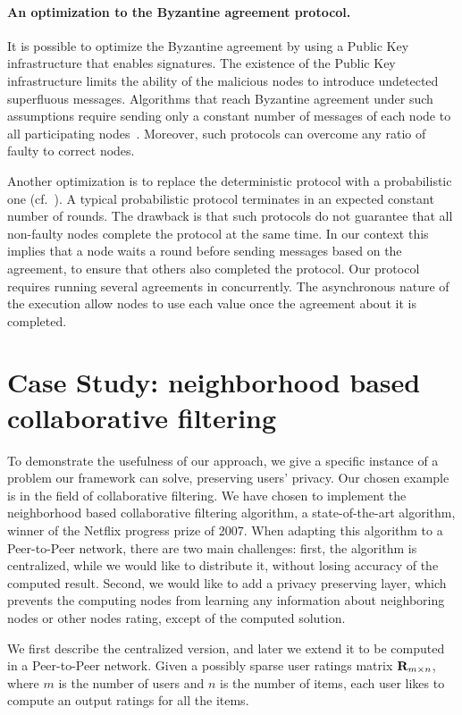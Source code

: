 \documentclass[10pt]{svjour3}
\begin{document}
\paragraph{An optimization to the Byzantine agreement protocol.}
It is possible to optimize the Byzantine agreement by using a Public Key infrastructure that enables signatures.
The existence of the Public Key infrastructure limits the ability of the malicious nodes to introduce undetected superfluous messages.  Algorithms that reach Byzantine agreement under such assumptions require sending only a constant number of messages of each node to all participating nodes~\cite{DS82}. Moreover, such protocols can overcome any ratio of faulty to correct nodes.

Another optimization is to replace the deterministic protocol with a probabilistic one (cf.~\cite{Benor83,FM89,CR93}). A typical probabilistic protocol terminates in an expected constant number of rounds.  The drawback is that such protocols do not guarantee that all non-faulty nodes complete the protocol at the same time. In our context this implies that a node waits a round before sending messages based on the agreement, to ensure that others also completed the protocol. Our protocol requires running several agreements in concurrently.  The asynchronous nature of the execution allow nodes to use each value once the agreement about it is completed.



\section{Case Study: neighborhood based collaborative filtering}
\label{jacobi} To demonstrate the usefulness of our approach, we
give a specific instance of a problem our framework can solve,
preserving users' privacy. Our chosen example is in the field of
collaborative filtering. We have chosen to implement the
neighborhood based collaborative filtering algorithm, a
state-of-the-art algorithm, winner of the Netflix progress prize
of 2007. When adapting this algorithm to a Peer-to-Peer network,
there are two main challenges: first, the algorithm is
centralized, while we would like to distribute it, without losing
accuracy of the computed result. Second, we would like to add a
privacy preserving layer, which prevents the computing nodes from
learning any information about neighboring nodes or other nodes
rating, except of the computed solution.

We first describe the centralized version, and later we extend it
to be computed in a Peer-to-Peer network. Given a possibly sparse
user ratings matrix ${\bf R}_{m \times n}$, where $m$ is the number of
users and $n$ is the number of items, each user likes to compute
an output ratings for all the items.
\end{document}
